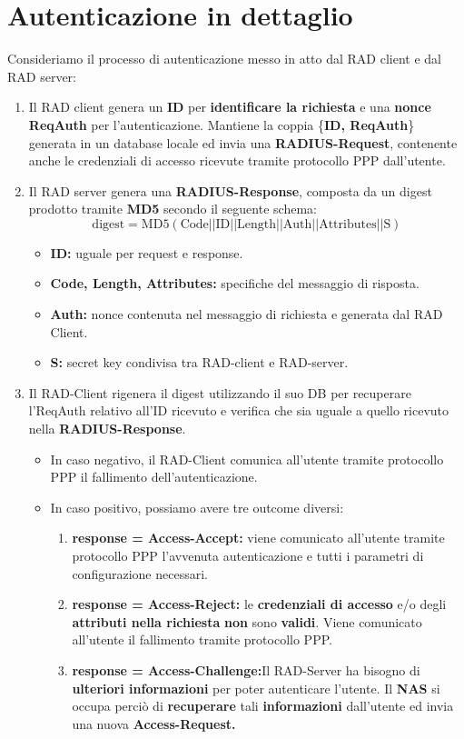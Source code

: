 \section{Autenticazione in dettaglio}
Consideriamo il processo di autenticazione messo in atto dal RAD client e dal RAD server:
\begin{proposition}
\begin{enumerate}
    \item Il RAD client genera un \textbf{ID} per \textbf{identificare la richiesta} e una \textbf{nonce ReqAuth} per l'autenticazione. Mantiene la coppia \{\textbf{ID, ReqAuth}\} generata in un database locale ed invia una \textbf{RADIUS-Request}, contenente anche le credenziali di accesso ricevute tramite protocollo PPP dall'utente.
    \item Il RAD server genera una \textbf{RADIUS-Response}, composta da un digest prodotto tramite \textbf{MD5} secondo il seguente schema:
    \[\text{digest}=\text{MD5}(\text{Code||ID||Length||Auth||Attributes||S})\]
    \begin{itemize}
        \item \textbf{ID:} uguale per request e response.
        \item \textbf{Code, Length, Attributes:} specifiche del messaggio di risposta.
        \item \textbf{Auth:} nonce contenuta nel messaggio di richiesta e generata dal RAD Client.
        \item \textbf{S:} secret key condivisa tra RAD-client e RAD-server.
    \end{itemize}
    \item Il RAD-Client rigenera il digest utilizzando il suo DB per recuperare l'ReqAuth relativo all'ID ricevuto e verifica che sia uguale a quello ricevuto nella \textbf{RADIUS-Response}.
    \begin{itemize}
        \item In caso negativo, il RAD-Client comunica all'utente tramite protocollo PPP il fallimento dell'autenticazione. 
        \item In caso positivo, possiamo avere tre outcome diversi:
        \begin{enumerate}
            \item \textbf{response = Access-Accept:} viene comunicato all'utente tramite protocollo PPP l'avvenuta autenticazione e tutti i parametri di configurazione necessari.
            \item \textbf{response = Access-Reject:} le \textbf{credenziali di accesso} e/o degli \textbf{attributi nella richiesta} \textbf{non} sono \textbf{validi}. Viene comunicato all'utente il fallimento tramite protocollo PPP.
            \item \textbf{response = Access-Challenge:}Il RAD-Server ha bisogno di \textbf{ulteriori informazioni} per poter autenticare l'utente. Il \textbf{NAS} si occupa perciò di \textbf{recuperare} tali \textbf{informazioni} dall'utente ed invia una nuova \textbf{Access-Request.}
        \end{enumerate}
    \end{itemize}
\end{enumerate}
\end{proposition}
